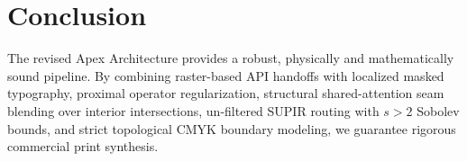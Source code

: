 \documentclass[10pt,journal,compsoc]{IEEEtran}
\begin{document}
\section{Conclusion}
The revised Apex Architecture provides a robust, physically and mathematically sound pipeline. By combining raster-based API handoffs with localized masked typography, proximal operator regularization, structural shared-attention seam blending over interior intersections, un-filtered SUPIR routing with $s>2$ Sobolev bounds, and strict topological CMYK boundary modeling, we guarantee rigorous commercial print synthesis.
\end{document}
